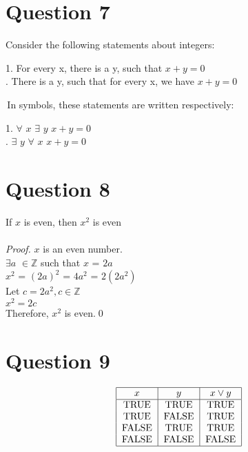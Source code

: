\documentclass{article}
\newcommand{\Z}{\mathbb{Z}}
\begin{document}
    \section*{Question 7}
    Consider the following statements about integers: \\ \par
    1. For every x, there is a y, such that $x + y = 0$ \\ 
    . There is a y, such that for every x, we have $x + y = 0$ \\ \par
    \,In symbols, these statements are written respectively: \\ \par
    1. $\forall$ $x$ $\exists$ $y$ $x + y = 0$ \\ 
    . $\exists$ $y$ $\forall$ $x$ $x + y = 0$ \\ 

    \section*{Question 8}
    
    If $x$ is even, then $x^2$ is even \\ \\
    \emph{Proof.} $x$ is an even number.\\
    $\exists a$ $\in\Z$ such that $x$ = $2a$ \\
    $x^2$ = $(2a)^2$ = $4a^2$ = $2(2a^2)$ \\
    Let $c = 2a^2, c\in\Z$ \\
    $x^2 = 2c$ \\
    Therefore, $x^2$ is even.\qed
    
     \section*{Question 9}
    \[\begin{tabular}{|c|c|c|}
    \hline
    $x$ & $y$ & $x\vee y$\\
    \hline
    TRUE & TRUE & TRUE \\
    TRUE & FALSE & TRUE \\
    FALSE & TRUE & TRUE \\
    FALSE & FALSE & FALSE\\
    \hline
    \end{tabular}\]
       
\end{document}

